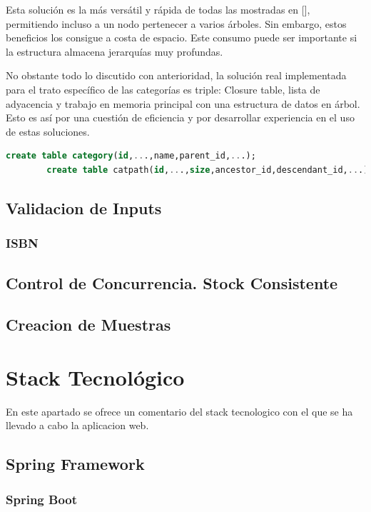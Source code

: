 \documentclass[a4paper]{report}
\begin{document}
    Esta solución es la más versátil y rápida de todas las mostradas en [], permitiendo incluso a un nodo pertenecer a varios árboles. Sin embargo, estos beneficios los consigue a costa de espacio. Este consumo puede ser importante si la estructura almacena jerarquías muy profundas.
    
    No obstante todo lo discutido con anterioridad, la solución real implementada para el trato específico de las categorías es triple: Closure table, lista de adyacencia y trabajo en memoria principal con una estructura de datos en árbol. Esto es así por una cuestión de eficiencia y por desarrollar experiencia en el uso de estas soluciones.
    
    \begin{lstlisting}[language=SQL]
    	create table category(id,...,name,parent_id,...);
    	create table catpath(id,...,size,ancestor_id,descendant_id,...);
    \end{lstlisting}
    
    \subsection{Validacion de Inputs}
    \subsubsection{ISBN}
    \subsection{Control de Concurrencia. Stock Consistente}
    \subsection{Creacion de Muestras}

    \section{Stack Tecnol\'ogico}
    En este apartado se ofrece un comentario del stack tecnologico con el que se ha llevado a cabo la aplicacion web.

    \subsection{Spring Framework}
    \subsubsection{Spring Boot}
\end{document}
